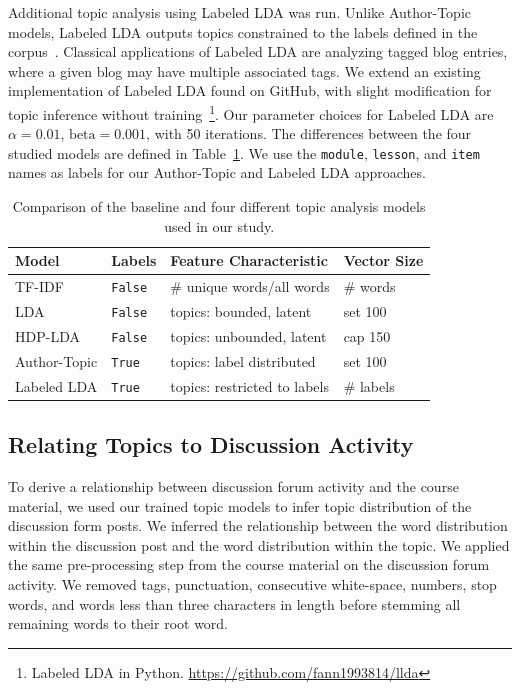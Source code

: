\documentclass[sigconf, nonacm=true]{acmart}
\begin{document}
Additional topic analysis using Labeled LDA was run.
Unlike Author-Topic models, Labeled LDA outputs topics constrained to the labels defined in the corpus~\cite{ramage2009labeled}.
Classical applications of Labeled LDA are analyzing tagged blog entries, where a given blog may have multiple associated tags.
We extend an existing implementation of Labeled LDA found on GitHub, with slight modification for topic inference without training~\footnote{Labeled LDA in Python.
    \url{https://github.com/fann1993814/llda}
    }.
Our parameter choices for Labeled LDA are $\alpha=0.01$, $\text{beta}=0.001$, with 50 iterations.
The differences between the four studied models are defined in Table~\ref{tab:topic_models}.
We use the \texttt{module}, \texttt{lesson}, and \texttt{item} names as labels for our Author-Topic and Labeled LDA approaches.

\begin{table}
    \centering
    \begin{tabularx}{\columnwidth}{@{}llll@{}}
    \toprule
    Model & Labels & Feature Characteristic & Vector Size \\
    \midrule
    TF-IDF & \texttt{False} & \# unique words/all words & \# words \\
    LDA & \texttt{False} & topics: bounded, latent & set 100 \\
    HDP-LDA & \texttt{False} & topics: unbounded, latent  & cap 150 \\
    Author-Topic & \texttt{True} & topics: label distributed & set 100 \\
    Labeled LDA & \texttt{True} & topics: restricted to labels & \# labels \\
    \bottomrule
    \end{tabularx}
    \caption{Comparison of the baseline and four different topic analysis models used in our study.}
    \label{tab:topic_models}
\end{table}

\subsection{Relating Topics to Discussion Activity}
To derive a relationship between discussion forum activity and the course material, we used our trained topic models to infer topic distribution of the discussion form posts.
We inferred the relationship between the word distribution within the discussion post and the word distribution within the topic.
We applied the same pre-processing step from the course material on the discussion forum activity. We removed tags, punctuation, consecutive white-space, numbers, stop words, and words less than three characters in length before stemming all remaining words to their root word.
\end{document}
